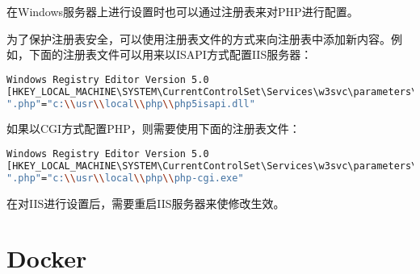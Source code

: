 在Windows服务器上进行设置时也可以通过注册表来对PHP进行配置。

为了保护注册表安全，可以使用注册表文件的方式来向注册表中添加新内容。例如，下面的注册表文件可以用来以ISAPI方式配置IIS服务器：


\begin{lstlisting}[language=bash]
Windows Registry Editor Version 5.0
[HKEY_LOCAL_MACHINE\SYSTEM\CurrentControlSet\Services\w3svc\parameters\Script Map]
".php"="c:\\usr\\local\\php\\php5isapi.dll"
\end{lstlisting}

如果以CGI方式配置PHP，则需要使用下面的注册表文件：




\begin{lstlisting}[language=bash]
Windows Registry Editor Version 5.0
[HKEY_LOCAL_MACHINE\SYSTEM\CurrentControlSet\Services\w3svc\parameters\Script Map]
".php"="c:\\usr\\local\\php\\php-cgi.exe"
\end{lstlisting}

在对IIS进行设置后，需要重启IIS服务器来使修改生效。

\section{Docker}






\begin{lstlisting}[language=bash]

\end{lstlisting}




\begin{lstlisting}[language=bash]

\end{lstlisting}





\begin{lstlisting}[language=bash]

\end{lstlisting}





